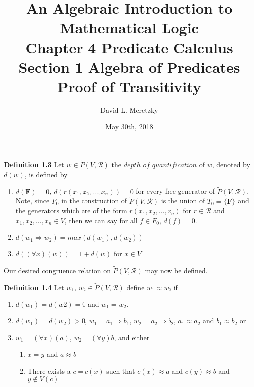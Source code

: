 \documentclass{article}
\title{ \vspace{-10ex} %
An Algebraic Introduction to Mathematical Logic\\
Chapter 4 Predicate Calculus \\
Section 1 Algebra of Predicates \\
Proof of Transitivity 
}
\author{David L. Meretzky
}
\date{%
May 30th, 2018
}
\theoremstyle{problemstyle}
\theoremstyle{lemmastyle}
\theoremstyle{theoremstyle}
\theoremstyle{problemstyle}
\begin{document}
\maketitle

\begin{flushleft}
\textbf{Definition 1.3} Let $w \in \widetilde{P}(V,\mathscr{R})$ the $depth$ $of$ $quantification$ of $w$, denoted by $d(w)$, is defined by 

\begin{enumerate}
\item $d(\textbf{F}) = 0$, $d(r(x_1,x_2,...,x_n)) = 0$ for every free generator of $\widetilde{P}(V,\mathscr{R})$. Note, since $F_0$ in the construction of $\widetilde{P}(V,\mathscr{R})$ is the union of $T_0 = \{\textbf{F}\}$ and the generators which are of the form $r(x_1,x_2,...,x_n)$ for $r \in \mathscr{R}$ and $x_1,x_2,...,x_n \in V$, then we can say for all $f \in F_0$, $d(f) = 0$. 

\item $d(w_1 \Rightarrow w_2) = max(d(w_1),d(w_2))$

\item $d((\forall x)(w)) = 1 + d(w)$ for $x \in V$ 
\end{enumerate}
\end{flushleft}
Our desired congruence relation on $\widetilde{P}(V,\mathscr{R})$ may now be defined.

\begin{flushleft}
\textbf{Definition 1.4} Let $w_1$, $w_2 \in \widetilde{P}(V,\mathscr{R})$ define $w_1 \approx w_2$ if

\begin{enumerate}
\item $d(w_1) = d(w2) = 0$ and $w_1 = w_2$. 
\item $d(w_1) = d(w_2) > 0$, $w_1 = a_1 \Rightarrow b_1$, $w_2 = a_2 \Rightarrow b_2$, $a_1 \approx a_2$ and $b_1 \approx b_2$ or 
\item $w_1 = (\forall x)(a)$, $w_2 = (\forall y)b$, and either
\begin{enumerate}
\item $x = y$ and $a \approx b$   
\item There exists a $c = c(x)$ such that $c(x) \approx a$ and $c(y) \approx b$ and $y \notin V(c)$ 
\end{enumerate}
\end{enumerate}
\end{flushleft}
\end{document}
